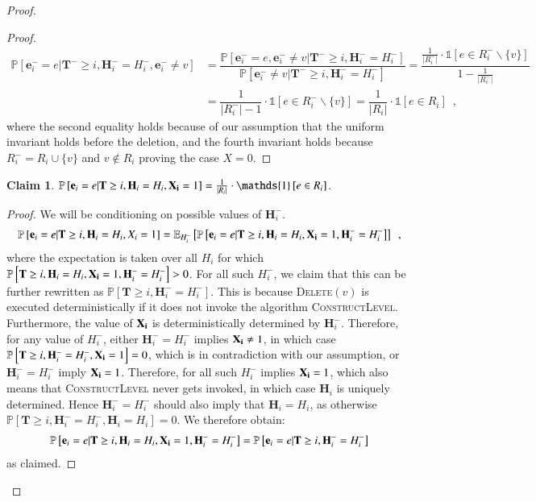 \documentclass[11pt]{article}
\newtheorem{claim}{Claim}[section]
\renewcommand{\Pr}[1]{\ensuremath{\mathbb{P}\left[#1\right]}}
\newcommand{\Exu}[2]{\ensuremath{\mathbb{E}_{#1}\left[#2\right]}}
\newcommand{\ind}[1]{\ensuremath{\mathds{1}\left[#1\right]}}
\newcommand{\constLevel}{\textsc{ConstructLevel}}
\newcommand{\deletev}{{\textsc{Delete}}}
\newcommand{\bE}{\ensuremath{\mathbf{e}}}
\newcommand{\bT}{\ensuremath{\mathbf{T}}}
\newcommand{\bH}{\ensuremath{\mathbf{H}}}
\begin{document}
\begin{proof}
\begin{proof}
\begin{align*}
\Pr{\bE_i^- = e | \bT^- \geq i, \bH_i^- = H_i^-, \bE_i^- \neq v} 
&= \dfrac {\Pr{\bE_i^- = e, \bE_i^- \neq v| \bT^- \geq i, \bH_i^- = H_i^-}}
    {\Pr{\bE_i^- \neq v| \bT^- \geq i, \bH_i^- = H_i^-}} 
= \dfrac{\frac{1}{|R_i^{-}|} \cdot \ind{e \in R_i^{-} \backslash \{v\}}}{1 - \frac{1}{|R_i^{-}|}} \\
&= \dfrac{1}{|R_i^{-}| - 1} \cdot \ind{e \in R_i^{-} \backslash \{v\}} 
= \dfrac{1}{|R_i|} \cdot \ind{e \in R_i} \enspace ,
\end{align*}
where the second equality holds because of our assumption that the uniform invariant holds before the deletion, and the fourth invariant holds because $R_i^- = R_i \cup \{v\}$ and $v \notin R_i$ proving the case $X=0$.
\end{proof}



\begin{claim}
\label{propos:cardinality:mat:delete2}
$\Pr{\bE_i = e | \bT \geq i, \bH_i = H_i, \bold{X_i} = 1} = \frac{1}{|R_i|} \cdot \ind{e \in R_i}$.
\end{claim}

\begin{proof}
We will be conditioning on possible values of $\bH_i^-$.  
\begin{align*}
    \Pr{\bE_i = e | \bT \geq i, \bH_i = H_i, X_i = 1} = \Exu{H_i^-}{\Pr{\bE_i = e | \bT \geq i, \bH_i = H_i, \bold{X_i} = 1, \bH_i^- = H_i^-}} \enspace ,
\end{align*}
where the expectation is taken over all $H_i$ for which $\Pr{\bT \geq i, \bH_i = H_i, \bold{X_i} = 1, \bH_i^- = H_i^-} > 0$.
For all such $H_i^-$, we claim that
this can be further rewritten as
$\Pr{\bT \geq i, \bH_i^- = H_i^-}$.
This is because \deletev$(v)$ is executed deterministically if it does not invoke 
the algorithm \constLevel{}. Furthermore, the value of $\bold{X_i}$ is
deterministically determined by $\bH_i^-$.
Therefore, for any value of $H_i^-$, either
$\bH_i^-=H_i^-$ implies $\bold{X_i}\ne 1$, in which case $\Pr{\bT \geq i, \bH_i^- = H_i^-, \bold{X_i} = 1} = 0$, which is in contradiction with our assumption, or 
$\bH_i^- = H_i^-$ imply
$\bold{X_i}=1$. Therefore, for all such $H_i^-$ implies $\bold{X_i}=1$, which also means that \constLevel{} never gets invoked, in which case $\bH_i$ is uniquely determined. Hence $\bH_i^- = H_i^-$ should also imply that $\bH_i = H_i$, as otherwise $\Pr{\bT \geq i, \bH_i^- = H_i^-, \bH_i = H_i} = 0$.
We therefore obtain: 
\begin{align*}
    \Pr{\bE_i = e | \bT \geq i, \bH_i = H_i, \bold{X_i} = 1, \bH_i^- = H_i^-} = \Pr{\bE_i = e | \bT \geq i, \bH_i^- = H_i^-} 
\end{align*}
as claimed.


\end{proof}
\end{proof}
\end{document}

